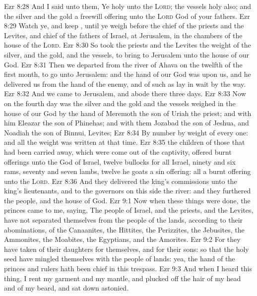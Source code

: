 \vs Ezr 8:28 And I said unto them, Ye  holy unto the \textsc{Lord}; the vessels  holy also; and the silver and the gold  a freewill offering unto the \textsc{Lord} God of your fathers.
\vs Ezr 8:29 Watch ye, and keep , until ye weigh  before the chief of the priests and the Levites, and chief of the fathers of Israel, at Jerusalem, in the chambers of the house of the \textsc{Lord}.
\vs Ezr 8:30 So took the priests and the Levites the weight of the silver, and the gold, and the vessels, to bring  to Jerusalem unto the house of our God.
\vs Ezr 8:31 Then we departed from the river of Ahava on the twelfth  of the first month, to go unto Jerusalem: and the hand of our God was upon us, and he delivered us from the hand of the enemy, and of such as lay in wait by the way.
\vs Ezr 8:32 And we came to Jerusalem, and abode there three days.
\vs Ezr 8:33 Now on the fourth day was the silver and the gold and the vessels weighed in the house of our God by the hand of Meremoth the son of Uriah the priest; and with him  Eleazar the son of Phinehas; and with them  Jozabad the son of Jeshua, and Noadiah the son of Binnui, Levites;
\vs Ezr 8:34 By number  by weight of every one: and all the weight was written at that time.
\vs Ezr 8:35  the children of those that had been carried away, which were come out of the captivity, offered burnt offerings unto the God of Israel, twelve bullocks for all Israel, ninety and six rams, seventy and seven lambs, twelve he goats  a sin offering: all  a burnt offering unto the \textsc{Lord}.
\vs Ezr 8:36 And they delivered the king's commissions unto the king's lieutenants, and to the governors on this side the river: and they furthered the people, and the house of God.
\vs Ezr 9:1 Now when these things were done, the princes came to me, saying, The people of Israel, and the priests, and the Levites, have not separated themselves from the people of the lands,  according to their abominations,  of the Canaanites, the Hittites, the Perizzites, the Jebusites, the Ammonites, the Moabites, the Egyptians, and the Amorites.
\vs Ezr 9:2 For they have taken of their daughters for themselves, and for their sons: so that the holy seed have mingled themselves with the people of  lands: yea, the hand of the princes and rulers hath been chief in this trespass.
\vs Ezr 9:3 And when I heard this thing, I rent my garment and my mantle, and plucked off the hair of my head and of my beard, and sat down astonied.
